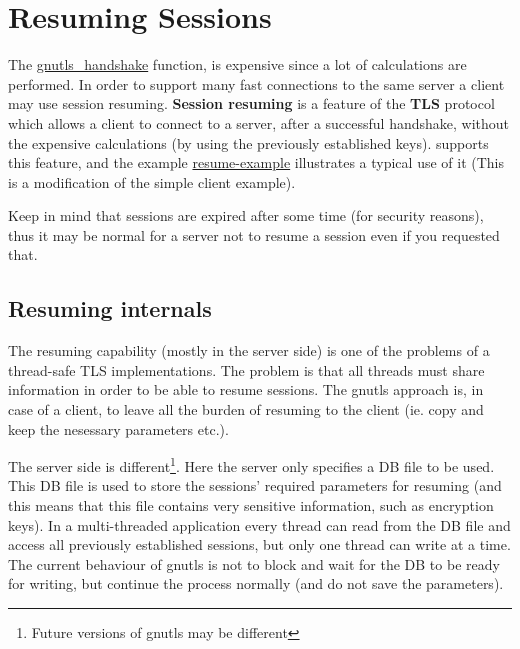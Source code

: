 \section{Resuming Sessions}
\par
The 
\hyperref{gnutls\_handshake()}{gnutls\_handshake() (see Section }{ for more information)}{gnutls_handshake}
 function, is expensive since a lot of calculations are performed. In order to support many fast connections to
the same server a client may use session resuming. {\bf Session resuming} is a
feature of the {\bf TLS} protocol which allows a client to connect to a server,
after a successful handshake, without the expensive calculations (by using the previously
established keys). \gnutls supports this feature, and the
example \hyperref{resume client}{resume client (see Section }{ for more
information)}{resume-example} illustrates a typical use of it (This is a modification of the simple client example).
\par
Keep in mind that sessions are expired after some time (for security reasons), thus
it may be normal for a server not to resume a session even if you requested that.

\subsection{Resuming internals}
The resuming capability (mostly in the server side) is one of the problems of a thread-safe TLS
implementations. The problem is that all threads must share information in
order to be able to resume sessions. The gnutls approach is, in case of a
client, to leave all the burden of resuming to the client (ie. copy and keep the
nesessary parameters etc.).
\par
The server side is different\footnote{Future versions of gnutls may be
different}. 
Here the server only specifies a DB file to be
used. This DB file is used to store the sessions' required parameters for
resuming (and this means that this file contains very sensitive information,
such as encryption keys). In a multi-threaded application every thread can
read from the DB file and access all previously established sessions, but
only one thread can write at a time. The current behaviour of gnutls is
not to block and wait for the DB to be ready for writing, but continue the
process normally (and do not save the parameters).  

